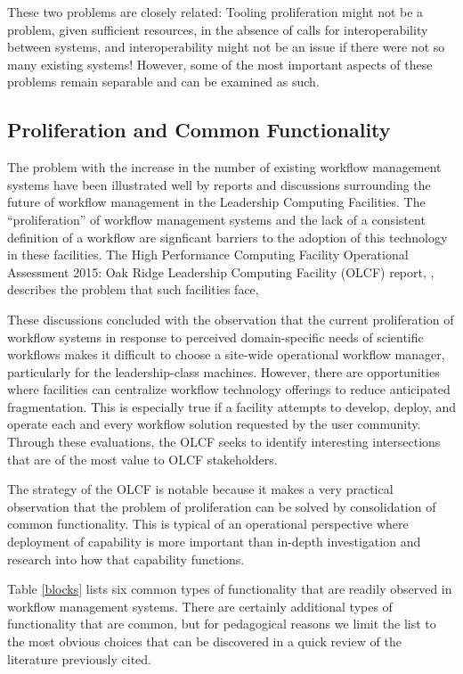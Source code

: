 These two problems are closely related: Tooling proliferation might not be a
problem, given sufficient resources, in the absence of calls for
interoperability between systems, and interoperability might not be an issue if
there were not so many existing systems! However, some of the most important
aspects of these problems remain separable and can be examined as such.

\subsection{Proliferation and Common Functionality} \label{commonFunc}

The problem with the increase in the number of existing workflow management
systems have been illustrated well by reports and discussions surrounding the
future of workflow management in the Leadership Computing Facilities. The
``proliferation'' of workflow management systems and the lack of a consistent
definition of a workflow are signficant barriers to the adoption of this
technology in these facilities. The High Performance Computing Facility
Operational Assessment 2015: Oak Ridge Leadership Computing Facility (OLCF)
report, \cite{barker_scientific_2007}, describes the problem that such
facilities face, \begin{displayquote} These discussions concluded with the
observation that the current proliferation of workflow systems in response to
perceived domain-specific needs of scientific workflows makes it difficult to
choose a site-wide operational workflow manager, particularly for the
leadership-class machines. However, there are opportunities where facilities can
centralize workflow technology offerings to reduce anticipated fragmentation.
This is especially true if a facility attempts to develop, deploy, and operate
each and every workflow solution requested by the user community. Through these
evaluations, the OLCF seeks to identify interesting intersections that are of
the most value to OLCF stakeholders.  \end{displayquote} The strategy of the
OLCF is notable because it makes a very practical observation that the problem
of proliferation can be solved by consolidation of common functionality. This is
typical of an operational perspective where deployment of capability is more
important than in-depth investigation and research into how that capability
functions. 

Table \ref{blocks} lists six common types of functionality that are readily
observed in workflow management systems. There are certainly additional types of
functionality that are common, but for pedagogical reasons we limit the list to
the most obvious choices that can be discovered in a quick review of the
literature previously cited.

